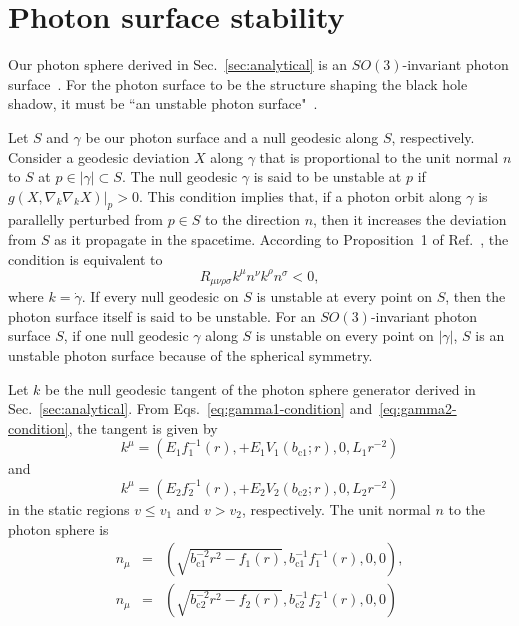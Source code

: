 \documentclass[prd,showpacs,preprintnumbers,groupedaddress,superscriptaddress,nofootinbib,11pt]{revtex4-1} %
\theoremstyle{newplain}
\newcommand{\mr}[1]{\mathrm{#1}}
\begin{document}
\afterpage{\clearpage}
\newpage

\section{Photon surface stability}
\label{sec:psf-stability}
Our photon sphere derived in Sec.~\ref{sec:analytical} is an $SO(3)$-invariant photon surface~\cite{claudel}.
For the photon surface to be the structure shaping the black hole shadow, it must be ``an unstable photon surface"~\cite{koga_2019}.
\par
Let $S$ and $\gamma$ be our photon surface and a null geodesic along $S$, respectively.
Consider a geodesic deviation $X$ along $\gamma$ that is proportional to the unit normal $n$ to $S$ at $p\in |\gamma|\subset S$.
The null geodesic $\gamma$ is said to be unstable at $p$ if $g(X,\nabla_k\nabla_k X)|_p>0$.
This condition implies that, if a photon orbit along $\gamma$ is parallelly perturbed from $p\in S$ to the direction $n$, then it increases the deviation from $S$ as it propagate in the spacetime.
According to Proposition~1 of Ref.~\cite{koga_2019}, the condition is equivalent to
\begin{equation}
R_{\mu\nu\rho\sigma}k^\mu n^\nu k^\rho n^\sigma<0,
\end{equation}
where $k=\dot\gamma$.
If every null geodesic on $S$ is unstable at every point on $S$, then the photon surface itself is said to be unstable.
For an $SO(3)$-invariant photon surface $S$, if one null geodesic $\gamma$ along $S$ is unstable on every point on $|\gamma|$, $S$ is an unstable photon surface because of the spherical symmetry.
\par
Let $k$ be the null geodesic tangent of the photon sphere generator derived in Sec.~\ref{sec:analytical}.
From Eqs.~\eqref{eq:gamma1-condition} and~\eqref{eq:gamma2-condition}, the tangent is given by
\begin{equation}
k^\mu=\left(E_1f_1^{-1}(r),+E_1V_1(b_{\mr{c}1};r),0,L_1r^{-2}\right)
\end{equation}
and
\begin{equation}
k^\mu=\left(E_2f_2^{-1}(r),+E_2V_2(b_{\mr{c}2};r),0,L_2r^{-2}\right)
\end{equation}
in the static regions $v\leq v_1$ and $v>v_2$, respectively.
The unit normal $n$ to the photon sphere is
\begin{eqnarray}
n_\mu&=&\left(\sqrt{b_{\mr{c}1}^{-2}r^2-f_1(r)},b_{\mr{c}1}^{-1}f_1^{-1}(r),0,0\right),\nonumber\\
n_\mu&=&\left(\sqrt{b_{\mr{c}2}^{-2}r^2-f_2(r)},b_{\mr{c}2}^{-1}f_2^{-1}(r),0,0\right)
\end{eqnarray}
\end{document}
